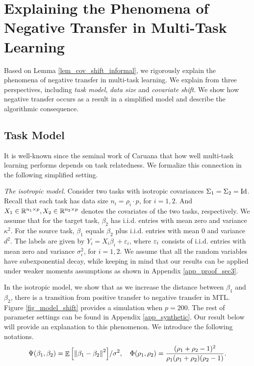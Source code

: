 \section{Explaining the Phenomena of Negative Transfer in Multi-Task Learning}\label{sec_insight}

Based on Lemma \ref{lem_cov_shift_informal}, we rigorously explain the phenomena of negative transfer in multi-task learning.
We explain from three perspectives, including \textit{task model}, \textit{data size} and \textit{covariate shift}.
We show how negative transfer occurs as a result in a simplified model and describe the algorithmic consequence.

\subsection{Task Model}\label{sec_similarity}

It is well-known since the seminal work of Caruana \cite{C97} that how well multi-task learning performs depends on task relatedness.
We formalize this connection in the following simplified setting.

\textit{The isotropic model.}
	Consider two tasks with isotropic covariances $\Sigma_1 = \Sigma_2 = \operatorname{Id}$.
	Recall that each task has data size $n_i = \rho_i \cdot p$, for $i = 1, 2$.
	And $X_1\in\mathbb{R}^{n_1\times p}, X_2\in\mathbb{R}^{n_2\times p}$ denotes the covariates of the two tasks, respectively.
	We assume that for the target task, $\beta_2$ has i.i.d. entries with mean zero and variance $\kappa^2$.
	For the source task, $\beta_1 $ equals $\beta_2$ plus i.i.d. entries with mean $0$ and variance $d^2$.
	The labels are given by $Y_i = X_i\beta_i + \varepsilon_i$, where ${\varepsilon}_i$ consists of i.i.d. entries with mean zero and variance $\sigma_i^2$, for $i=1,2$.
	We assume that all the random variables have subexponential decay, while keeping in mind that our results can be applied under weaker moments assumptions as shown in Appendix \ref{app_proof_sec3}.

In the isotropic model, we show that as we increase the distance between $\beta_1$ and $\beta_2$, there is a transition from positive transfer to negative transfer in MTL.
Figure \ref{fig_model_shift} provides a simulation when $p = 200$.
{The rest of parameter settings can be found in Appendix \ref{app_synthetic}.}
Our result below will provide an explanation to this phenomenon.
We introduce the following notations.
\begin{align*}
	\Psi(\beta_1, \beta_2) = {\mathop{\mathbb{E}}\left[ \left\| \beta_1 - \beta_2 \right\|^2 \right]} / {\sigma^2},  \quad \Phi(\rho_1, \rho_2) = \frac{(\rho_1 + \rho_2 - 1)^2}{\rho_1 (\rho_1 + \rho_2) (\rho_2 - 1)}.
\end{align*}

